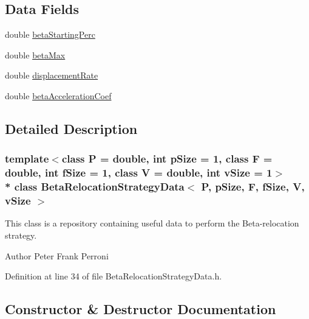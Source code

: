 \subsection*{Data Fields}
\begin{DoxyCompactItemize}
\item 
double \hyperlink{structBetaRelocationStrategyData_a979c9c710b41d2d745ef519b4eff2b9b}{beta\+Starting\+Perc}
\item 
double \hyperlink{structBetaRelocationStrategyData_acfd06a41587b792b0f85807fe800b46a}{beta\+Max}
\item 
double \hyperlink{structBetaRelocationStrategyData_a92704a1adaddfe1d7545fd3f1c921fcd}{displacement\+Rate}
\item 
double \hyperlink{structBetaRelocationStrategyData_a957ba3439a50f2dadf2e500ac0cfcd3c}{beta\+Acceleration\+Coef}
\end{DoxyCompactItemize}


\subsection{Detailed Description}
\subsubsection*{template$<$class P = double, int p\+Size = 1, class F = double, int f\+Size = 1, class V = double, int v\+Size = 1$>$\\*
class Beta\+Relocation\+Strategy\+Data$<$ P, p\+Size, F, f\+Size, V, v\+Size $>$}

This class is a repository containing useful data to perform the Beta-\/relocation strategy. 

\begin{DoxyAuthor}{Author}
Peter Frank Perroni 
\end{DoxyAuthor}


Definition at line 34 of file Beta\+Relocation\+Strategy\+Data.\+h.



\subsection{Constructor \& Destructor Documentation}
